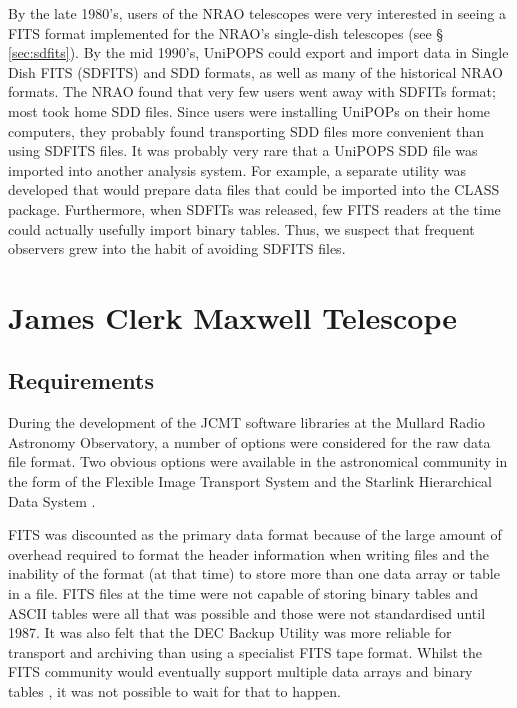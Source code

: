\documentclass[final,authoryear,5p,times,twocolumn]{elsarticle}
\newcommand{\ascl}[1]{\href{http://www.ascl.net/#1}{ascl:#1}}
\begin{document}
By the late 1980's, users of the NRAO telescopes were very interested
in seeing a FITS format implemented for the NRAO's single-dish
telescopes (see \S\,\ref{sec:sdfits}). By the mid 1990's,
UniPOPS could export and import data in Single Dish FITS (SDFITS) and
SDD formats, as well as many
of the historical NRAO formats.  The NRAO found that very few users
went away with SDFITs format; most took home SDD files.  Since
users were installing UniPOPs on their home computers, they probably
found transporting SDD files more convenient than using
SDFITS files.  It was probably very rare that a UniPOPS SDD file was
imported into another analysis system.  For example, a separate
utility was developed that would prepare data files that could be
imported into the {\textsc CLASS} package.
Furthermore, when SDFITs was released, few FITS readers at the
time could actually usefully import binary tables.  Thus, we suspect
that frequent observers grew into the habit of avoiding SDFITS files.

\section{James Clerk Maxwell Telescope}

\subsection{Requirements}

During the development of the JCMT software libraries at the Mullard
Radio Astronomy Observatory, a number of options were considered for
the raw data file format.  Two obvious options were available in the
astronomical community in the form of the Flexible Image Transport System
\citep[FITS;][]{1981A&AS...44..363W} and the Starlink Hierarchical
Data System \citep[HDS;][\ascl{1502.009}]{1982QJRAS..23..485D,2015HDS}.

FITS was discounted as the primary data format because of the large
amount of overhead required to format the header information when
writing files and the inability of the format (at that time) to store
more than one data array or table in a file. FITS files at the time
were not capable of storing binary tables and ASCII tables were all
that was possible \citep{1988A&AS...73..365H} and those were not
standardised until 1987. It was also felt that the DEC Backup Utility
was more reliable for transport and archiving than using a specialist
FITS tape format. Whilst the FITS community would eventually support
multiple data arrays \citep{1988A&AS...73..359G} and binary tables
\citep{1995A&AS..113..159C}, it was not possible to wait for that to
happen.
\end{document}
